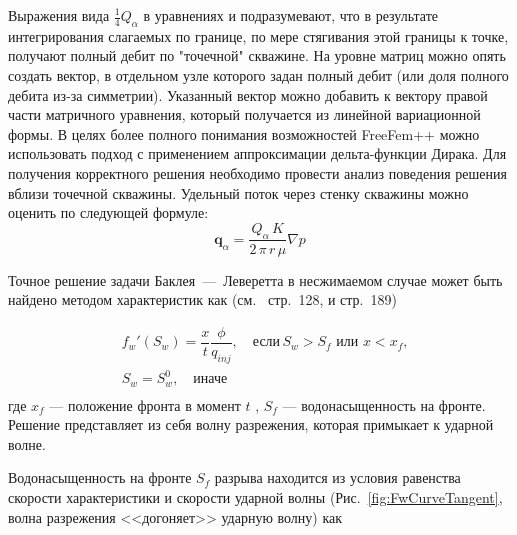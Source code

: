 Выражения вида $\frac{1}{4}Q_{\alpha}$ в уравнениях  и  подразумевают,
что в результате интегрирования слагаемых по границе, по мере стягивания этой границы к точке, получают полный дебит по "точечной" скважине.
На уровне матриц можно опять создать вектор, в отдельном узле которого задан полный дебит (или доля полного дебита из-за симметрии).
Указанный вектор можно добавить к вектору правой части матричного уравнения, который получается из линейной вариационной формы.
В целях более полного понимания возможностей FreeFem++ можно использовать подход с применением аппроксимации дельта-функции Дирака.
Для получения корректного решения необходимо провести анализ поведения решения вблизи точечной скважины. Удельный поток через стенку 
скважины можно оценить по следующей формуле:
\begin{equation}
	\mathbf{q}_\alpha=\frac{Q_\alpha\,K}{2\,\pi\,r\,\mu}\nabla p
\end{equation}


Точное решение задачи Баклея~---~Леверетта в несжимаемом случае может быть найдено методом характеристик как (см.~\cite{Barenblatt_Entov_Ryzhik_1984} стр.~128, и \cite{Collins_1984} стр.~189)

\begin{equation}\label{exactSol_test}
	\begin{split}
		& f_w'(S_w) = \dfrac{x}{t} \dfrac{\phi}{q_{inj}}, \quad \text{если}\, S_w > S_f \text{ или } x < x_f, \\
		 & S_w=S_w^0, \quad \text{иначе} \\
	\end{split}
	\end{equation}
	где $x_f$ --- положение фронта в момент $t$ , $S_f$ --- водонасыщенность на фронте.
Решение представляет из себя волну разрежения, которая примыкает к ударной волне.

Водонасыщенность на фронте $S_f$ разрыва находится из условия равенства скорости характеристики и скорости ударной волны (Рис.~\ref{fig:FwCurveTangent}, волна разрежения <<догоняет>> ударную волну) как

